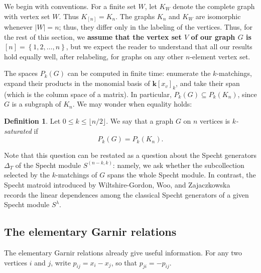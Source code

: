 \documentclass[12pt]{amsart}
\newtheorem{problem}[theorem]{Problem}
\theoremstyle{definition}
\newtheorem{definition}[theorem]{Definition}
\theoremstyle{remark}
\newcommand{\kk}{\mathbf{k}}
\newcommand{\Match}{\operatorname{Match}}
\begin{document}
We begin with conventions.
For a finite set $W$, let $K_W$ denote the complete graph with vertex
set $W$.  Thus $K_{[n]}=K_n$.
The graphs $K_n$ and $K_W$ are isomorphic whenever $\left|W\right| = n$;
thus, they differ only in the labeling of the vertices. Thus, for the
rest of this section, we \textbf{assume that the vertex set $V$ of
our graph $G$ is $[n] = \left\{1,2,\ldots,n\right\}$}, but we expect the
reader to understand that all our results hold equally well, after relabeling,
for graphs on any other $n$-element vertex set.

The spaces $P_k(G)$ can be computed in finite time: enumerate the
$k$-matchings, expand their products in the monomial basis of
$\kk[x_v]_k$, and take their span (which is the column space of
a matrix).
In particular, $P_k(G) \subseteq P_k(K_n)$, since $G$ is a
subgraph of $K_n$.
We may wonder when equality holds:

\begin{definition}
Let $0\leq k\leq\lfloor n/2\rfloor$.  We say that a graph $G$ on $n$
vertices is \emph{$k$-saturated} if
\[
 P_k(G)=P_k(K_n).
\]
\end{definition}


Note that this question can be restated as a question about the
Specht generators $\Delta_T$ of the Specht module $S^{(n-k,k)}$:
namely, we ask whether the subcollection selected by the
$k$-matchings of $G$ spans the whole Specht module.
In contrast, the Specht matroid introduced by
Wiltshire-Gordon, Woo, and Zajaczkowska~\cite{WGWZ} records the linear
dependences among the classical Specht generators of a given
Specht module $S^\lambda$.

\subsection{The elementary Garnir relations}

The elementary Garnir relations already give useful information.  For any
two vertices $i$ and $j$, write $p_{ij}=x_i-x_j$, so that $p_{ji}=-p_{ij}$.
\end{document}
